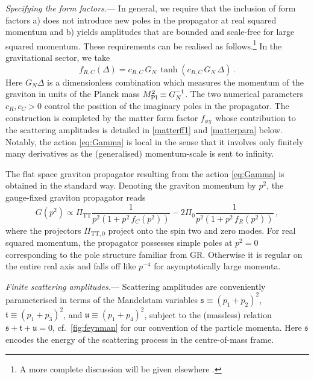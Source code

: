 \documentclass[aps,prl,onecolumn,superscriptaddress,longbibliography,nofootinbib,floatfix,showpacs,12pt]{revtex4-1}
\newcommand{\GR}{{\small GR}}
\newcommand{\mans}{\ensuremath{\mathfrak{s}}}
\newcommand{\mant}{\ensuremath{\mathfrak{t}}}
\newcommand{\manu}{\ensuremath{\mathfrak{u}}}
\begin{document}
\textit{Specifying the form factors.}---
In general, we require that the inclusion of form factors a) does not introduce new poles in the propagator at real squared momentum and b) yields amplitudes that are bounded and scale-free for large squared momentum.
These requirements can be realised as follows.\footnote{A more complete discussion will be given elsewhere \cite{Draper:2020knh}.} 
In the gravitational sector, we take
%
\begin{equation}\label{infiniteres}
				f_{R,C}(\Delta)
		=
				c_{R,C} \, G_N	\, \tanh \left(	c_{R,C} \,	G_N	\, \Delta	\right)
		\, .
\end{equation}
%
Here $G_N \Delta$ is a dimensionless combination which measures the momentum of the graviton in units of the Planck mass $M_{\rm Pl}^2 \equiv G_N^{-1}$.
The two numerical parameters $c_{R}, c_{C} > 0$ control the position of the imaginary poles in the propagator.
The construction is completed by the matter form factor $f_{\phi\chi}$ whose contribution to the scattering amplitudes is detailed in \eqref{matterff1} and \eqref{matterpara} below.
Notably, the action \eqref{eq:Gamma} is local in the sense that it involves only finitely many derivatives as the (generalised) momentum-scale is sent to infinity.

The flat space graviton propagator resulting from the action \eqref{eq:Gamma} is obtained in the standard way.
Denoting the graviton momentum by $p^2$, the gauge-fixed graviton propagator reads
%
\begin{equation}\label{IRMprop}
 G(p^2) \propto \Pi_\text{TT} \frac{1}{p^2(1+p^2 \, f_C(p^2))} -2 \Pi_0 \frac{1}{p^2(1+p^2 \, f_R(p^2))} \, ,
\end{equation}
%
where the projectors $\Pi_{\text{TT},0}$ project onto the spin two and zero modes.
For real squared momentum, the propagator possesses simple poles at $p^2 = 0$ corresponding to the pole structure familiar from \GR{}.
Otherwise it is regular on the entire real axis and falls off like $p^{-4}$ for asymptotically large momenta.


\textit{Finite scattering amplitudes.}--- Scattering amplitudes are conveniently parameterised in terms of the Mandelstam variables $\mans \equiv (p_1 + p_2)^2$, $\mant \equiv (p_1 + p_3)^2$, and $\manu \equiv (p_1 + p_4)^2$, subject to the (massless) relation $\mans + \mant + \manu = 0$, cf.\ \autoref{fig:feynman} for our convention of the particle momenta.
Here $\mans$ encodes the energy of the scattering process in the centre-of-mass frame.  
\end{document}
